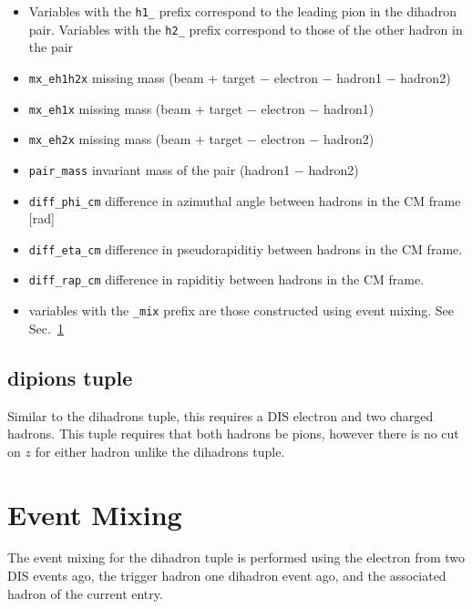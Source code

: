 \documentclass[english]{article}
\newcommand{\code}[1]{\texttt{#1}}
\begin{document}
\begin{itemize}
\item Variables with the \code{h1\_} prefix correspond to the leading pion in the dihadron pair.  Variables with the \code{h2\_} prefix correspond to those of the other hadron in the pair
\item \code{mx\_eh1h2x} missing mass (beam + target $-$ electron $-$ hadron1 $-$ hadron2)
\item \code{mx\_eh1x} missing mass (beam + target $-$ electron $-$ hadron1)
\item \code{mx\_eh2x} missing mass (beam + target $-$ electron $-$ hadron2)
\item \code{pair\_mass} invariant mass of the pair (hadron1 $-$ hadron2)
\item \code{diff\_phi\_cm} difference in azimuthal angle between hadrons in the CM frame [rad]
\item \code{diff\_eta\_cm} difference in pseudorapiditiy between hadrons in the CM frame.
\item \code{diff\_rap\_cm} difference in rapiditiy between hadrons in the CM frame.
\item  variables with the \code{\_mix} prefix are those constructed using event mixing.  See Sec.~\ref{sec:event_mixing}
\end{itemize}

\subsection{dipions tuple}
Similar to the dihadrons tuple, this requires a DIS electron and two charged hadrons.  This tuple requires that both hadrons be pions, however there is no cut on $z$ for either hadron unlike the dihadrons tuple. 
\section{Event Mixing}
\label{sec:event_mixing}
The event mixing for the dihadron tuple is performed using the electron from two DIS events ago, the trigger hadron one dihadron event ago, and the associated hadron of the current entry.  
\end{document}
